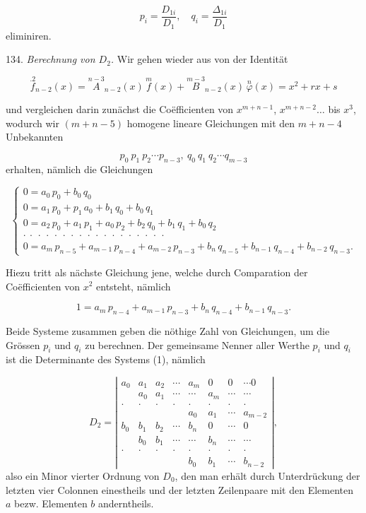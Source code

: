 \documentclass[11pt]{article}
\providecommand{\weberpage}[1]{}
\providecommand{\weq}[2]{\begin{equation}\tag{#1}#2\end{equation}}
\let\Delta\varDelta
\begin{document}
\[
p_i = \frac{D_{1i}}{D_1},\quad q_i = \frac{\Delta_{1i}}{D_1}
\]
eliminiren.

134. \textit{Berechnung von $D_2$.} Wir gehen wieder aus von der Identität

\weq{III}{\overset{.2}{f}_{n-2}(x) = \overset{n-3}{A}_{n-2}(x)\,\overset{m}{f}(x) + \overset{m-3}{B}_{n-2}(x)\,\overset{n}{\varphi}(x) = x^2 + rx + s}

und vergleichen darin zunächst die Co\"efficienten von $x^{m+n-1}$, $x^{m+n-2}\ldots$ bis $x^3$, wodurch wir $(m+n-5)$ homogene lineare Gleichungen mit den $m+n-4$ Unbekannten

\[
p_0\ p_1\ p_2 \cdots p_{n-3},\ q_0\ q_1\ q_2 \cdots q_{m-3}
\]
erhalten, nämlich die Gleichungen

\weq{1}{
\left\{
\begin{gathered}
0 = a_0\,p_0 + b_0\,q_0\\
0 = a_1\,p_0 + p_1\,a_0 + b_1\,q_0 + b_0\,q_1\\
0 = a_2\,p_0 + a_1\,p_1 + a_0\,p_2 + b_2\,q_0 + b_1\,q_1 + b_0\,q_2\\
\cdot\ \cdot\ \cdot\ \cdot\ \cdot\ \cdot\ \cdot\ \cdot\ \cdot\ \cdot\ \cdot\ \cdot\ \cdot\ \cdot\ \cdot\ \cdot\ \cdot\ \cdot\\
0 = a_m\,p_{n-5} + a_{m-1}\,p_{n-4} + a_{m-2}\,p_{n-3} + b_n\,q_{n-5} + b_{n-1}\,q_{n-4} + b_{n-2}\,q_{n-3}.
\end{gathered}
\right.
}

Hiezu tritt als nächste Gleichung jene, welche durch Comparation der Co\"efficienten von $x^2$ entsteht, nämlich

\weq{2}{1 = a_m\,p_{n-4} + a_{m-1}\,p_{n-3} + b_n\,q_{n-4} + b_{n-1}\,q_{n-3}.}


\weberpage{142}

Beide Systeme zusammen geben die nöthige Zahl von Gleichungen, um die Grössen $p_i$ und $q_i$ zu berechnen. Der gemeinsame Nenner aller Werthe $p_i$ und $q_i$ ist die Determinante des Systems (1), nämlich

\[
D_2 =
\left|
\begin{array}{cccccccc}
a_0 & a_1 & a_2 & \cdots & a_m & 0 & 0 & \cdots 0\\
 & a_0 & a_1 & \cdots & \cdots & a_m & \cdots & \cdots\\
 \cdot & \cdot & \cdot & \cdot & \cdot & \cdot & \cdot & \cdot\\
 & & & & a_0 & a_1 & \cdots & a_{m-2}\\
b_0 & b_1 & b_2 & \cdots & b_n & 0 & \cdots & 0\\
 & b_0 & b_1 & \cdots & \cdots & b_n & \cdots & \cdots\\
 \cdot & \cdot & \cdot & \cdot & \cdot & \cdot & \cdot & \cdot\\
 & & & & b_0 & b_1 & \cdots & b_{n-2}
\end{array}
\right|,
\]
also ein Minor vierter Ordnung von $D_0$, den man erhält durch Unterdrückung der letzten vier Colonnen einestheils und der letzten Zeilenpaare mit den Elementen $a$ bezw. Elementen $b$ anderntheils.
\end{document}
